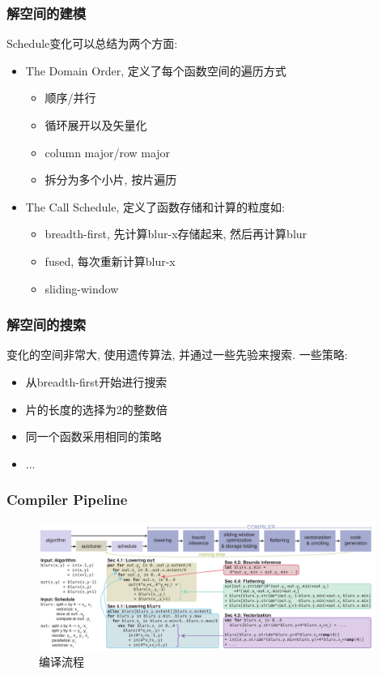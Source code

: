 \documentclass[hyperref]{beamer}
\begin{document}
\begin{frame}
  \frametitle{解空间的建模}
  Schedule变化可以总结为两个方面:
  \begin{itemize}
  \item The Domain Order, 定义了每个函数空间的遍历方式
    \begin{itemize}
    \item 顺序/并行
    \item 循环展开以及矢量化
    \item column major/row major
    \item 拆分为多个小片, 按片遍历
    \end{itemize}
  \item The Call Schedule, 定义了函数存储和计算的粒度如:
    \begin{itemize}
    \item breadth-first, 先计算blur-x存储起来, 然后再计算blur
    \item fused, 每次重新计算blur-x
    \item sliding-window
    \end{itemize}
  \end{itemize}
\end{frame}

\begin{frame}
  \frametitle{解空间的搜索}
  变化的空间非常大, 使用遗传算法, 并通过一些先验来搜索. 一些策略:
  \begin{itemize}
  \item 从breadth-first开始进行搜索
  \item 片的长度的选择为2的整数倍
  \item 同一个函数采用相同的策略
  \item ...
  \end{itemize}
\end{frame}

\begin{frame}
  \frametitle{Compiler Pipeline}
  \begin{figure}[H]
    \centering
    \includegraphics[width=11cm]{compiler_pipeline.png}
    \caption{编译流程}
    \label{fig:compiler-pipeline}
  \end{figure}
\end{frame}
\end{document}
